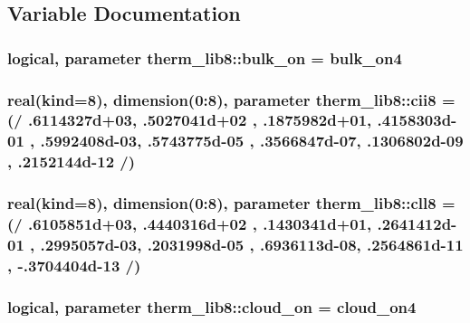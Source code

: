 \subsection{Variable Documentation}
\subsubsection[{\texorpdfstring{bulk\+\_\+on}{bulk_on}}]{\setlength{\rightskip}{0pt plus 5cm}logical, parameter therm\+\_\+lib8\+::bulk\+\_\+on = bulk\+\_\+on4}\hypertarget{namespacetherm__lib8_aa2d5118204fcd26e0603d47b2bd1a48c}{}\label{namespacetherm__lib8_aa2d5118204fcd26e0603d47b2bd1a48c}
\subsubsection[{\texorpdfstring{cii8}{cii8}}]{\setlength{\rightskip}{0pt plus 5cm}real(kind=8), dimension(0\+:8), parameter therm\+\_\+lib8\+::cii8 = (/ .\+6114327d+03, .\+5027041d+02 , .\+1875982d+01, .\+4158303d-\/01 , .\+5992408d-\/03, .\+5743775d-\/05 , .\+3566847d-\/07, .\+1306802d-\/09 , .\+2152144d-\/12 /)}\hypertarget{namespacetherm__lib8_aa9cd8b30beb20347cc9a45f40fd72baa}{}\label{namespacetherm__lib8_aa9cd8b30beb20347cc9a45f40fd72baa}
\subsubsection[{\texorpdfstring{cll8}{cll8}}]{\setlength{\rightskip}{0pt plus 5cm}real(kind=8), dimension(0\+:8), parameter therm\+\_\+lib8\+::cll8 = (/ .\+6105851d+03, .\+4440316d+02 , .\+1430341d+01, .\+2641412d-\/01 , .\+2995057d-\/03, .\+2031998d-\/05 , .\+6936113d-\/08, .\+2564861d-\/11 , -\/.\+3704404d-\/13 /)}\hypertarget{namespacetherm__lib8_a1f1e0a0dd53bbaf4515bc58ada29dba7}{}\label{namespacetherm__lib8_a1f1e0a0dd53bbaf4515bc58ada29dba7}
\subsubsection[{\texorpdfstring{cloud\+\_\+on}{cloud_on}}]{\setlength{\rightskip}{0pt plus 5cm}logical, parameter therm\+\_\+lib8\+::cloud\+\_\+on = cloud\+\_\+on4}\hypertarget{namespacetherm__lib8_a826524c63660fd35bee5d07fa43c19e0}{}\label{namespacetherm__lib8_a826524c63660fd35bee5d07fa43c19e0}
